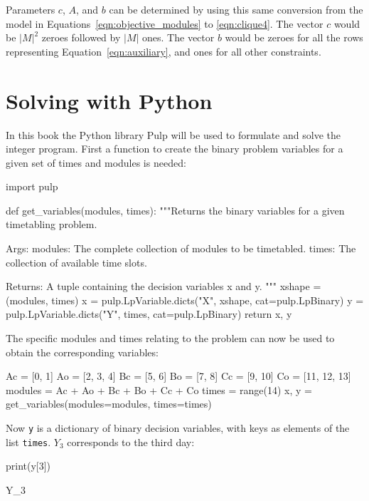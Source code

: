Parameters \(c\), \(A\), and \(b\) can be determined by using this same conversion
from the model in Equations~\ref{eqn:objective_modules} to \ref{eqn:clique4}.
The vector \(c\) would be \(|M|^2\) zeroes followed by \(|M|\) ones.
The vector \(b\) would be zeroes for all the rows representing
Equation~\ref{eqn:auxiliary}, and ones for all other constraints.

\section{Solving with Python}\label{sec:solving-with-python}

In this book the Python library Pulp will be used to
formulate and solve the integer program. First a function to create the
binary problem variables for a given set of times and modules is needed:

\begin{pyin}
import pulp


def get_variables(modules, times):
    """Returns the binary variables for a given timetabling
    problem.

    Args:
        modules: The complete collection of modules to be
                 timetabled.
        times: The collection of available time slots.

    Returns:
        A tuple containing the decision variables x and y.
    """
    xshape = (modules, times)
    x = pulp.LpVariable.dicts("X", xshape, cat=pulp.LpBinary)
    y = pulp.LpVariable.dicts("Y", times, cat=pulp.LpBinary)
    return x, y
\end{pyin}

The specific modules and times relating to the problem can now be used to
obtain the corresponding variables:

\begin{pyin}
Ac = [0, 1]
Ao = [2, 3, 4]
Bc = [5, 6]
Bo = [7, 8]
Cc = [9, 10]
Co = [11, 12, 13]
modules = Ac + Ao + Bc + Bo + Cc + Co
times = range(14)
x, y = get_variables(modules=modules, times=times)
\end{pyin}

Now \texttt{y} is a dictionary of binary decision variables, with
keys as elements of the list \texttt{times}. \(Y_3\) corresponds to
the third day:

\begin{pyin}
print(y[3])
\end{pyin}

\begin{pyout}
Y_3
\end{pyout}

